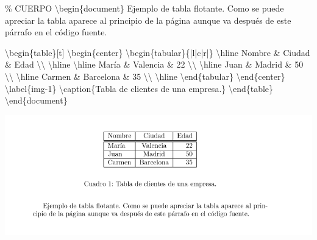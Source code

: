 \documentclass[
  letterpaper,
  DIV=11,
  numbers=noendperiod]{scrreport}
\newenvironment{Shaded}{\begin{snugshade}}{\end{snugshade}}
\newcommand{\CommentTok}[1]{\textcolor[rgb]{0.37,0.37,0.37}{#1}}
\newcommand{\ExtensionTok}[1]{\textcolor[rgb]{0.00,0.23,0.31}{#1}}
\newcommand{\FunctionTok}[1]{\textcolor[rgb]{0.28,0.35,0.67}{#1}}
\newcommand{\KeywordTok}[1]{\textcolor[rgb]{0.00,0.23,0.31}{#1}}
\newcommand{\NormalTok}[1]{\textcolor[rgb]{0.00,0.23,0.31}{#1}}
\newcommand{\OperatorTok}[1]{\textcolor[rgb]{0.37,0.37,0.37}{#1}}
\begin{document}
\begin{Shaded}
\begin{Highlighting}[]
\CommentTok{\% CUERPO}
\KeywordTok{\textbackslash{}begin}\NormalTok{\{}\ExtensionTok{document}\NormalTok{\}}
\NormalTok{Ejemplo de tabla flotante. Como se puede apreciar la tabla aparece al principio de la página aunque va después de este párrafo en el código fuente.}

\KeywordTok{\textbackslash{}begin}\NormalTok{\{}\ExtensionTok{table}\NormalTok{\}[t]}
\KeywordTok{\textbackslash{}begin}\NormalTok{\{}\ExtensionTok{center}\NormalTok{\}}
\KeywordTok{\textbackslash{}begin}\NormalTok{\{}\ExtensionTok{tabular}\NormalTok{\}\{|l|c|r|\}}
\FunctionTok{\textbackslash{}hline}
\NormalTok{Nombre }\OperatorTok{\&}\NormalTok{ Ciudad }\OperatorTok{\&}\NormalTok{ Edad }\FunctionTok{\textbackslash{}\textbackslash{}} 
\FunctionTok{\textbackslash{}hline}
\FunctionTok{\textbackslash{}hline}
\NormalTok{María }\OperatorTok{\&}\NormalTok{ Valencia }\OperatorTok{\&}\NormalTok{ 22 }\FunctionTok{\textbackslash{}\textbackslash{}}
\FunctionTok{\textbackslash{}hline}
\NormalTok{Juan }\OperatorTok{\&}\NormalTok{ Madrid }\OperatorTok{\&}\NormalTok{ 50 }\FunctionTok{\textbackslash{}\textbackslash{}}
\FunctionTok{\textbackslash{}hline}
\NormalTok{Carmen }\OperatorTok{\&}\NormalTok{ Barcelona }\OperatorTok{\&}\NormalTok{ 35 }\FunctionTok{\textbackslash{}\textbackslash{}}
\FunctionTok{\textbackslash{}hline}
\KeywordTok{\textbackslash{}end}\NormalTok{\{}\ExtensionTok{tabular}\NormalTok{\}}
\KeywordTok{\textbackslash{}end}\NormalTok{\{}\ExtensionTok{center}\NormalTok{\}}
\KeywordTok{\textbackslash{}label}\NormalTok{\{}\ExtensionTok{img{-}1}\NormalTok{\}}
\FunctionTok{\textbackslash{}caption}\NormalTok{\{Tabla de clientes de una empresa.\}}
\KeywordTok{\textbackslash{}end}\NormalTok{\{}\ExtensionTok{table}\NormalTok{\}}
\KeywordTok{\textbackslash{}end}\NormalTok{\{}\ExtensionTok{document}\NormalTok{\}}
\end{Highlighting}
\end{Shaded}

\begin{tcolorbox}[enhanced jigsaw, colback=white, colframe=quarto-callout-note-color-frame, title={Salida}, bottomtitle=1mm, colbacktitle=quarto-callout-note-color!10!white, bottomrule=.15mm, titlerule=0mm, opacityback=0, toptitle=1mm, arc=.35mm, left=2mm, rightrule=.15mm, toprule=.15mm, coltitle=black, leftrule=.75mm, opacitybacktitle=0.6, breakable]
\includegraphics{./img/entornos-flotantes/tabla-flotante.png}
\end{tcolorbox}
\end{document}
